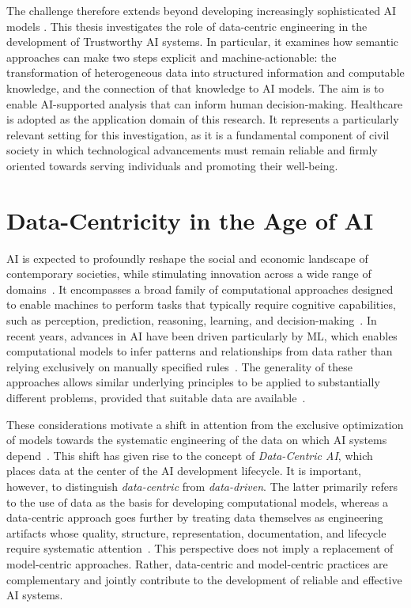 The challenge therefore extends beyond developing increasingly sophisticated AI models \cite{zha_data-centric_2025, kaur_trustworthy_2022}. This thesis investigates the role of data-centric engineering in the development of Trustworthy AI systems. In particular, it examines how semantic approaches can make two steps explicit and machine-actionable: the transformation of heterogeneous data into structured information and computable knowledge, and the connection of that knowledge to AI models. The aim is to enable AI-supported analysis that can inform human decision-making. Healthcare is adopted as the application domain of this research. It represents a particularly relevant setting for this investigation, as it is a fundamental component of civil society in which technological advancements must remain reliable and firmly oriented towards serving individuals and promoting their well-being.

\section{Data-Centricity in the Age of AI}

AI is expected to profoundly reshape the social and economic landscape of contemporary societies, while stimulating innovation across a wide range of domains~\cite{annoni_artificial_2018}. It encompasses a broad family of computational approaches designed to enable machines to perform tasks that typically require cognitive capabilities, such as perception, prediction, reasoning, learning, and decision-making~\cite{hamon_robustness_2020}. In recent years, advances in AI have been driven particularly by ML, which enables computational models to infer patterns and relationships from data rather than relying exclusively on manually specified rules~\cite{chamola_review_2023}. The generality of these approaches allows similar underlying principles to be applied to substantially different problems, provided that suitable data are available~\cite{annoni_artificial_2018}.

These considerations motivate a shift in attention from the exclusive optimization of models towards the systematic engineering of the data on which AI systems depend~\cite{zha_data-centric_2025}. This shift has given rise to the concept of \emph{Data-Centric AI}, which places data at the center of the AI development lifecycle. It is important, however, to distinguish \emph{data-centric} from \emph{data-driven}. The latter primarily refers to the use of data as the basis for developing computational models, whereas a data-centric approach goes further by treating data themselves as engineering artifacts whose quality, structure, representation, documentation, and lifecycle require systematic attention~\cite{zha_data-centric_2025}. This perspective does not imply a replacement of model-centric approaches. Rather, data-centric and model-centric practices are complementary and jointly contribute to the development of reliable and effective AI systems.

